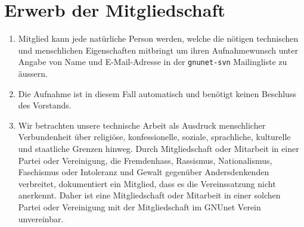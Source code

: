 \documentclass[german,a4paper]{article} %
\newenvironment{enumpar}{%
  \renewcommand{\labelenumi}{\theenumi}%
  \renewcommand{\theenumi}{(\arabic{enumi})}%
  \renewcommand{\labelenumii}{\theenumii}%
  \renewcommand{\theenumii}{(\alph{enumii})}%
  \begin{enumerate}}
{\end{enumerate}}
\begin{document}
\section{Erwerb der Mitgliedschaft}
\label{Mitgliedschaft}
\begin{enumpar}
\item Mitglied kann jede natürliche Person werden, welche die nötigen technischen und menschlichen Eigenschaften mitbringt um ihren Aufnahmewunsch unter Angabe von Name und E-Mail-Adresse in der {\tt gnunet-svn} Mailingliste zu äussern.
\item Die Aufnahme ist in diesem Fall automatisch und ben\"otigt keinen Beschluss des Vorstands.
\item Wir betrachten unsere technische Arbeit als Ausdruck menschlicher Verbundenheit über religiöse, konfessionelle, soziale, sprachliche, kulturelle und staatliche Grenzen hinweg. Durch Mitgliedschaft oder Mitarbeit in einer Partei oder Vereinigung, die Fremdenhass, Rassismus, Nationalismus, Faschismus oder Intoleranz und Gewalt gegenüber Andersdenkenden verbreitet, dokumentiert ein Mitglied, dass es die Vereinssatzung nicht anerkennt. Daher ist eine Mitgliedschaft oder Mitarbeit in einer solchen Partei oder Vereinigung mit der Mitgliedschaft im GNUnet Verein unvereinbar.
\end{enumpar}
\end{document}
